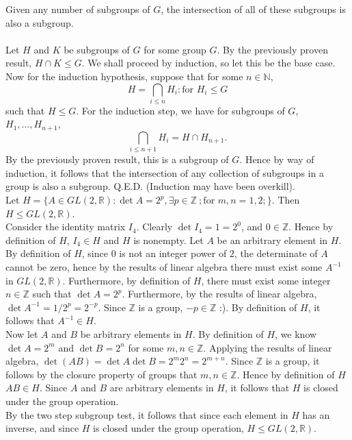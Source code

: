 \documentclass{article}
\newcommand{\N}{\mathbb{N}}
\newcommand{\Z}{\mathbb{Z}}
\newcommand{\R}{\mathbb{R}}
\begin{document}
 Given any number of subgroups of $G$, the intersection of all of these subgroups is also a subgroup.\\
\\
Let $H$ and $K$ be subgroups of $G$ for some group $G$. By the previously proven result, $H\cap K \le G$. We shall proceed by induction, so let this be the base case.\\
Now for the induction hypothesis, suppose that for some $n  \in \N$, 
$$H = \bigcap_{i\le n}H_i: \mbox{for } H_i\le G$$ such that $H\le G$. For the induction step, we have for subgroups of $G$, $H_1,\dots, H_{n+1}$, $$\bigcap_{i\le n+1}H_i = H \cap H_{n+1}.$$ By the previously proven result, this is a subgroup of $G$. Hence by way of induction, it follows that the intersection of any collection of subgroups in a group is also a subgroup. Q.E.D. (Induction may have been overkill). \\



 Let $H = \{A \in GL(2,\R) : \det A = 2^p,\exists  p\in \Z\ ;\mbox{for } m,n = 1,2; \}$. Then $H\le GL(2,\R)$.\\
 Consider the identity matrix $I_4$. Clearly $\det I_4 = 1 = 2^0$, and $0\in \Z$. Hence by definition of $H$, $I_4\in H$ and $H$ is nonempty. Let $A$ be an arbitrary element in $H$. By definition of $H$, since $0$ is not an integer power of $2$, the determinate of $A$ cannot be zero, hence by the results of linear algebra there must exist some $A^{-1}$ in $GL(2,\R)$. Furthermore, by definition of $H$, there must exist some integer $n\in \Z$ such that $\det A = 2^p$. Furthermore, by the results of linear algebra, $\det A^{-1} = 1/2^p = 2^{-p}.$ Since $\Z$ is a group, $-p \in \Z$ :). By definition of $H$, it follows that $A^{-1}\in H$.\\
Now let $A$ and $B$ be arbitrary elements in $H$. By definition of $H$, we know $\det A = 2^m$ and $\det B = 2^n$ for some $m,n \in \Z$. Applying the results of linear algebra, $\det(AB) = \det A \det B = 2^m 2^n = 2^{m + n}.$ Since $\Z$ is a group, it follows by the closure property of groups that $m,n \in \Z$. Hence by definition of $H$ $AB \in H$. Since $A$ and $B$ are arbitrary elements in $H$, it follows that $H$ is closed under the group operation.\\
By the two step subgroup test, it follows that since each element in $H$ has an inverse, and since $H$ is closed under the group operation, $H\le GL(2,\R).$\\
\end{document}

